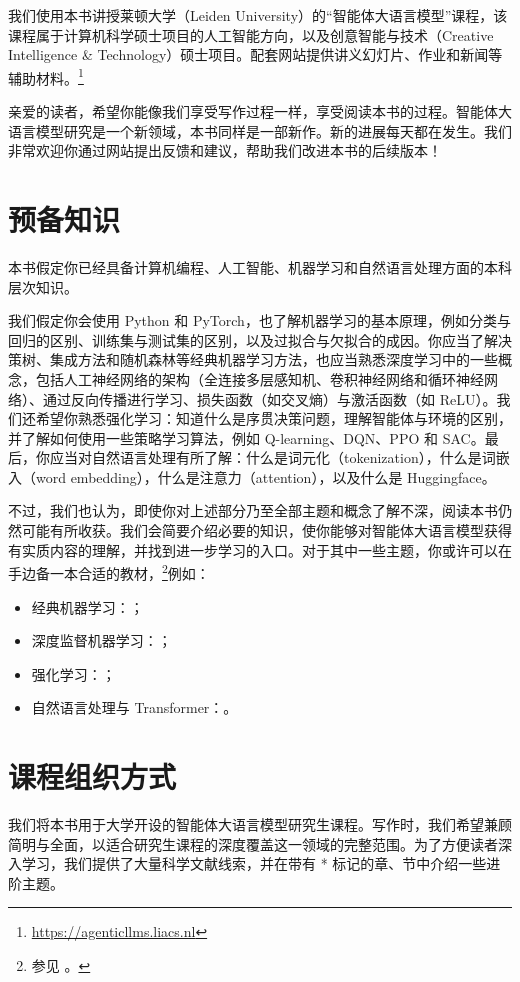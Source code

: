 我们使用本书讲授莱顿大学（Leiden University）的“智能体大语言模型”课程，该课程属于计算机科学硕士项目的人工智能方向，以及创意智能与技术（Creative Intelligence \& Technology）硕士项目。配套网站提供讲义幻灯片、作业和新闻等辅助材料。\footnote{\url{https://agenticllms.liacs.nl}}

亲爱的读者，希望你能像我们享受写作过程一样，享受阅读本书的过程。智能体大语言模型研究是一个新领域，本书同样是一部新作。新的进展每天都在发生。我们非常欢迎你通过网站提出反馈和建议，帮助我们改进本书的后续版本！

\section{预备知识}
本书假定你已经具备计算机编程、人工智能、机器学习和自然语言处理方面的本科层次知识。

我们假定你会使用 Python 和 PyTorch，也了解机器学习的基本原理，例如分类与回归的区别、训练集与测试集的区别，以及过拟合与欠拟合的成因。你应当了解决策树、集成方法和随机森林等经典机器学习方法，也应当熟悉深度学习中的一些概念，包括人工神经网络的架构（全连接多层感知机、卷积神经网络和循环神经网络）、通过反向传播进行学习、损失函数（如交叉熵）与激活函数（如 ReLU）。我们还希望你熟悉强化学习：知道什么是序贯决策问题，理解智能体与环境的区别，并了解如何使用一些策略学习算法，例如 Q-learning、DQN、PPO 和 SAC。最后，你应当对自然语言处理有所了解：什么是词元化（tokenization），什么是词嵌入（word embedding），什么是注意力（attention），以及什么是 Huggingface。

不过，我们也认为，即使你对上述部分乃至全部主题和概念了解不深，阅读本书仍然可能有所收获。我们会简要介绍必要的知识，使你能够对智能体大语言模型获得有实质内容的理解，并找到进一步学习的入口。对于其中一些主题，你或许可以在手边备一本合适的教材，\footnote{参见 \citet{gunasekar2024textbooks}。}例如：
\begin{itemize}
    \item 经典机器学习：\citet{alpaydin2021machine,flach2012machine}；
    \item 深度监督机器学习：\citet{bishop2023deep,goodfellow2016deep,chollet2021deep,stevens2020deep}；
    \item 强化学习：\citet{sutton2018reinforcement,graesser2019foundations,plaat2022deep,franccois2018introduction}；
    \item 自然语言处理与 Transformer：\citet{jm3}。
\end{itemize}

\section{课程组织方式}
我们将本书用于大学开设的智能体大语言模型研究生课程。写作时，我们希望兼顾简明与全面，以适合研究生课程的深度覆盖这一领域的完整范围。为了方便读者深入学习，我们提供了大量科学文献线索，并在带有 * 标记的章、节中介绍一些进阶主题。


